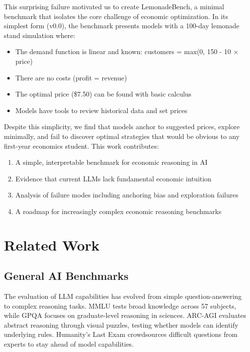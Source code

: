 \documentclass[11pt]{article}
\begin{document}
This surprising failure motivated us to create LemonadeBench, a minimal benchmark that isolates the core challenge of economic optimization.
In its simplest form (v0.0), the benchmark presents models with a 100-day lemonade stand simulation where:
\begin{itemize}
    \item The demand function is linear and known: customers = max(0, 150 - 10 × price)
    \item There are no costs (profit = revenue)
    \item The optimal price (\$7.50) can be found with basic calculus
    \item Models have tools to review historical data and set prices
\end{itemize}

Despite this simplicity, we find that models anchor to suggested prices, explore minimally, and fail to discover optimal strategies that would be obvious to any first-year economics student.
This work contributes:
\begin{enumerate}
    \item A simple, interpretable benchmark for economic reasoning in AI
    \item Evidence that current LLMs lack fundamental economic intuition
    \item Analysis of failure modes including anchoring bias and exploration failures
    \item A roadmap for increasingly complex economic reasoning benchmarks
\end{enumerate}

\section{Related Work}

\subsection{General AI Benchmarks}

The evaluation of LLM capabilities has evolved from simple question-answering to complex reasoning tasks.
MMLU \citep{hendrycks2021mmlu} tests broad knowledge across 57 subjects, while GPQA \citep{rein2023gpqa} focuses on graduate-level reasoning in sciences.
ARC-AGI \citep{chollet2019arc} evaluates abstract reasoning through visual puzzles, testing whether models can identify underlying rules.
Humanity's Last Exam \citep{hle2024} crowdsources difficult questions from experts to stay ahead of model capabilities.
\end{document}
